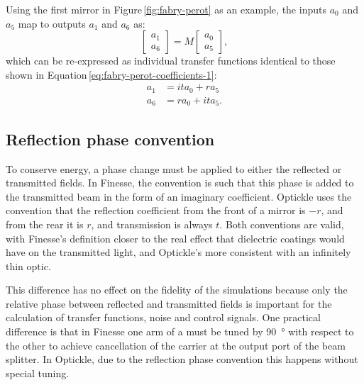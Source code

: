 Using the first mirror in Figure\,\ref{fig:fabry-perot} as an example, the inputs $a_0$ and $a_5$ map to outputs $a_1$ and $a_6$ as:
\begin{equation}
  \begin{bmatrix}
    a_1 \\
    a_6
  \end{bmatrix}
  =
  M
  \begin{bmatrix}
    a_0 \\
    a_5
  \end{bmatrix}
  ,
\end{equation}
which can be re-expressed as individual transfer functions identical to those shown in Equation\,\ref{eq:fabry-perot-coefficients-1}:
\begin{equation}
  \begin{split}
    a_1 &= it a_0 + r a_5 \\
    a_6 &= r a_0 + it a_5.
  \end{split}
\end{equation}

\subsection{\label{a:reflection-phase}Reflection phase convention}
To conserve energy, a phase change must be applied to either the reflected or transmitted fields. In Finesse, the convention is such that this phase is added to the transmitted beam in the form of an imaginary coefficient. Optickle uses the convention that the reflection coefficient from the front of a mirror is $-r$, and from the rear it is $r$, and transmission is always $t$. Both conventions are valid, with Finesse's definition closer to the real effect that dielectric coatings would have on the transmitted light, and Optickle's more consistent with an infinitely thin optic.

This difference has no effect on the fidelity of the simulations because only the relative phase between reflected and transmitted fields is important for the calculation of transfer functions, noise and control signals. One practical difference is that in Finesse one arm of a \MI{} must be tuned by \SI{90}{\degree} with respect to the other to achieve cancellation of the carrier at the output port of the beam splitter. In Optickle, due to the reflection phase convention this happens without special tuning.

